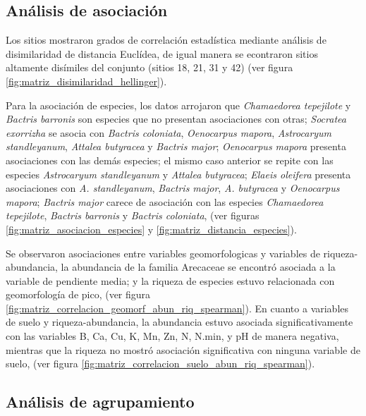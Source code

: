 \documentclass[11pt,]{article}
\begin{document}
\subsection{Análisis de asociación}\label{anuxe1lisis-de-asociaciuxf3n}

Los sitios mostraron grados de correlación estadística mediante análisis
de disimilaridad de distancia Euclídea, de igual manera se econtraron
sitios altamente disímiles del conjunto (sitios 18, 21, 31 y 42) (ver
figura \ref{fig:matriz_disimilaridad_hellinger}).

Para la asociación de especies, los datos arrojaron que
\emph{Chamaedorea tepejilote} y \emph{Bactris barronis} son especies que
no presentan asociaciones con otras; \emph{Socratea exorrizha} se asocia
con \emph{Bactris coloniata}, \emph{Oenocarpus mapora},
\emph{Astrocaryum standleyanum}, \emph{Attalea butyracea} y
\emph{Bactris major}; \emph{Oenocarpus mapora} presenta asociaciones con
las demás especies; el mismo caso anterior se repite con las especies
\emph{Astrocaryum standleyanum} y \emph{Attalea butyracea}; \emph{Elaeis
oleifera} presenta asociaciones con \emph{A. standleyanum},
\emph{Bactris major}, \emph{A. butyracea} y \emph{Oenocarpus mapora};
\emph{Bactris major} carece de asociación con las especies
\emph{Chamaedorea tepejilote}, \emph{Bactris barronis} y \emph{Bactris
coloniata}, (ver figuras \ref{fig:matriz_asociacion_especies} y
\ref{fig:matriz_distancia_especies}).

Se observaron asociaciones entre variables geomorfologicas y variables
de riqueza-abundancia, la abundancia de la familia Arecaceae se encontró
asociada a la variable de pendiente media; y la riqueza de especies
estuvo relacionada con geomorfología de pico, (ver figura
\ref{fig:matriz_correlacion_geomorf_abun_riq_spearman}). En cuanto a
variables de suelo y riqueza-abundancia, la abundancia estuvo asociada
significativamente con las variables B, Ca, Cu, K, Mn, Zn, N, N.min, y
pH de manera negativa, mientras que la riqueza no mostró asociación
significativa con ninguna variable de suelo, (ver figura
\ref{fig:matriz_correlacion_suelo_abun_riq_spearman}).

\subsection{Análisis de
agrupamiento}\label{anuxe1lisis-de-agrupamiento-1}
\end{document}
